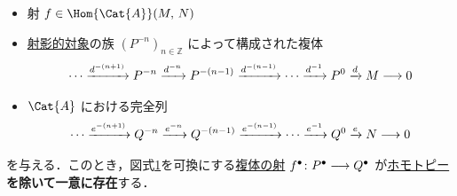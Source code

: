\documentclass[algtopo_main]{subfiles}
\begin{document}
\begin{mylem}[label=lem:LDF-1]{}
    \begin{itemize}
        \item  射 $f \in \Hom{\Cat{A}}(M,\, N)$
        \item \hyperref[def:proj-mod]{射影的対象}の族 $(P^{-n})_{n \in \mathbb{Z}}$ によって構成された複体
        \begin{align}
            \cdots \xrightarrow{d^{-(n+1)}} P^{-n} \xrightarrow{d^{-n}} P^{-(n-1)} \xrightarrow{d^{-(n-1)}} \cdots \xrightarrow{d^{-1}} P^{0} \xrightarrow{d} M \longrightarrow 0
        \end{align}
        \item $\Cat{A}$ における完全列
        \begin{align}
            \cdots \xrightarrow{e^{-(n+1)}} Q^{-n} \xrightarrow{e^{-n}} Q^{-(n-1)} \xrightarrow{e^{-(n-1)}} \cdots \xrightarrow{e^{-1}} Q^{0} \xrightarrow{e} N \longrightarrow 0
        \end{align}
    \end{itemize}
    を与える．このとき，図式\ref{cmtd:LDF-1}を可換にする\hyperref[def:chain-morphism]{複体の射} $f^\bullet \colon P^\bullet \longrightarrow Q^\bullet$ が\hyperref[def:chain-homotopy]{ホモトピー}\textbf{を除いて一意に存在}する．
\end{mylem}

\begin{figure}[H]
    \centering
    \caption{}
    \label{cmtd:LDF-1}
\end{figure}%
\end{document}
